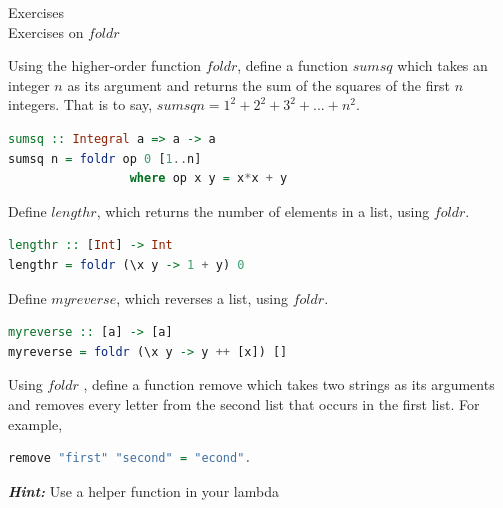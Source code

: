 \documentclass{article}
\newcommand\ExTitle{Exercises on $foldr$}
\newcommand\fullExTitle{Exercises \\ \ExTitle }
\begin{document}
\begin{Huge}
	\begin{center}
	\fullExTitle
	\end{center}
\end{Huge}

\begin{exercise} 
Using the higher-order function $foldr$,  define a function $sumsq$ which takes an
integer $n$ as its argument and returns the sum of the squares of the first $n$
integers. That is to say,
$sumsq n = 1^{2} + 2^{2} + 3^{2} + . . . + n^{2} $. \\

\end{exercise}

\begin{solution}
\begin{lstlisting}[language=Haskell]
sumsq :: Integral a => a -> a
sumsq n = foldr op 0 [1..n]
                 where op x y = x*x + y
\end{lstlisting}
\end{solution}

\begin{exercise} 
Define $lengthr$, which returns the number of elements in a list, using $foldr$. 
\end{exercise}

\begin{solution}
\begin{lstlisting}[language=Haskell]
lengthr :: [Int] -> Int
lengthr = foldr (\x y -> 1 + y) 0
\end{lstlisting}

\end{solution}


\pagebreak
\begin{exercise} 
Define $myreverse$, which reverses a list, using $foldr$.
\end{exercise} 

\begin{solution}
\begin{lstlisting}[language=Haskell]
myreverse :: [a] -> [a]
myreverse = foldr (\x y -> y ++ [x]) []
\end{lstlisting}
\end{solution}


\begin{exercise} 
Using $foldr$ , define a function remove which takes two strings as its arguments
and removes every letter from the second list that occurs in the first list. For
example, 
\begin{lstlisting}[language=Haskell]
remove "first" "second" = "econd".
\end{lstlisting}
\textbf{\textit{Hint:}} Use a helper function in your lambda 
\end{exercise} 
\end{document}
